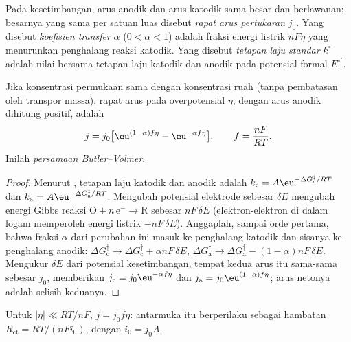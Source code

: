 \begin{definition}\label{def:b3:electrode-kinetics:exchange}
Pada kesetimbangan, arus anodik dan arus katodik sama besar dan berlawanan;
besarnya yang sama per satuan luas disebut \emph{rapat arus
pertukaran} $j_0$. Yang disebut \emph{koefisien
transfer} $\alpha$ ($0 < \alpha < 1$) adalah fraksi energi
listrik $nF\eta$ yang menurunkan penghalang reaksi katodik. Yang disebut
\emph{tetapan laju standar} $k^\circ$ adalah nilai
bersama tetapan laju katodik dan anodik pada potensial formal $E^{\circ\prime}$.
\end{definition}

\begin{theorem}\label{thm:b3:electrode-kinetics:butler-volmer}
Jika konsentrasi permukaan sama dengan konsentrasi ruah (tanpa pembatasan oleh
transpor massa), rapat arus pada overpotensial $\eta$, dengan arus anodik
dihitung positif, adalah
\[
  j = j_0\bigl[\eu^{(1 - \alpha)f\eta} - \eu^{-\alpha f\eta}\bigr], \qquad f = \frac{nF}{RT}.
\]
Inilah \emph{persamaan Butler--Volmer}.
\end{theorem}

\begin{proof}
Menurut , tetapan laju katodik dan anodik adalah
$k_{\mathrm c} = A\eu^{-\Delta G_{\mathrm c}^{\ddagger}/RT}$ dan $k_{\mathrm a} = A\eu^{-\Delta G_{\mathrm a}^{\ddagger}/RT}$.
Mengubah potensial elektrode sebesar $\delta E$ mengubah energi Gibbs reaksi
$\mathrm{O} + n\,\mathrm{e}^- \to \mathrm{R}$ sebesar $nF\,\delta E$ (elektron-elektron di dalam
logam memperoleh energi listrik $-nF\,\delta E$). Anggaplah, sampai orde
pertama, bahwa fraksi $\alpha$ dari perubahan ini masuk ke penghalang katodik
dan sisanya ke penghalang anodik:
$\Delta G_{\mathrm c}^{\ddagger} \to \Delta G_{\mathrm c}^{\ddagger} + \alpha nF\,\delta E$, $\Delta G_{\mathrm a}^{\ddagger} \to \Delta G_{\mathrm a}^{\ddagger} - (1 - \alpha)nF\,\delta E$.
Mengukur $\delta E$ dari potensial kesetimbangan, tempat kedua arus itu
sama-sama sebesar $j_0$, memberikan $j_{\mathrm c} = j_0\eu^{-\alpha f\eta}$ dan
$j_{\mathrm a} = j_0\eu^{(1 - \alpha)f\eta}$; arus netonya adalah selisih keduanya.
\end{proof}

\begin{corollary}\label{cor:b3:electrode-kinetics:linear}
Untuk $|\eta| \ll RT/nF$, $j = j_0f\eta$: antarmuka itu berperilaku sebagai hambatan
$R_{\mathrm{ct}} = RT/(nFi_0)$, dengan $i_0 = j_0A$.
\end{corollary}


